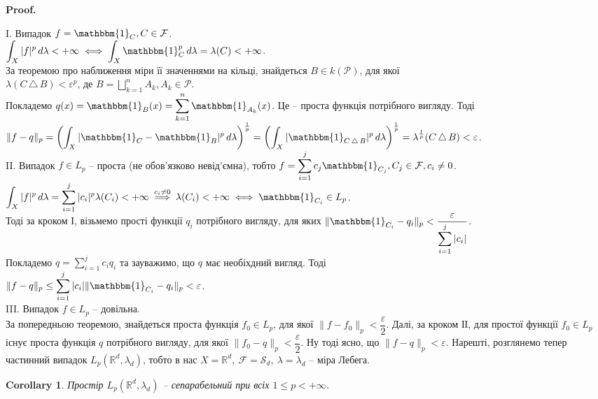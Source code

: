 \documentclass[a4paper, 10pt]{article}
\makeatletter
\theoremstyle{theoremdd}
\newtheorem{corollary}[theorem]{Corollary}
\renewenvironment{proof}[1][Proof.\\]{\par
\pushQED{\hfill \qed}%
\normalfont \topsep6\p@\@plus6\p@\relax
\trivlist
\item\relax
{\bfseries
#1\@addpunct{.}}\hspace\labelsep\ignorespaces
}{%
\popQED\endtrivlist\@endpefalse
}
\newcommand{\symdif}{\,\triangle\,} %
\makeatother
\begin{document}
\begin{proof}
I. Випадок $f = \mathbbm{1}_C, C \in \mathcal{F}$.\\
$\displaystyle\int_X |f|^p\,d\lambda < +\infty \iff \int_X \mathbbm{1}_C^p\,d\lambda = \lambda(C) < +\infty$.\\
За теоремою про наближення міри її значеннями на кільці, знайдеться $B \in k(\mathcal{P})$, для якої \\ $\lambda(C \symdif B) < \varepsilon^p$, де $B = \displaystyle\bigsqcup_{k=1}^n A_k, A_k \in \mathcal{P}$.\\
Покладемо $q(x) = \mathbbm{1}_B(x) = \displaystyle\sum_{k=1}^n \mathbbm{1}_{A_k}(x)$. Це -- проста функція потрібного вигляду. Тоді\\
$\|f-q\|_p = \displaystyle \left(\int_X |\mathbbm{1}_C - \mathbbm{1}_B|^p\,d\lambda \right)^{\frac{1}{p}} = \left( \int_X |\mathbbm{1}_{C \symdif B}|^p\,d\lambda \right)^{\frac{1}{p}} = \lambda^{\frac{1}{p}}(C \symdif B) < \varepsilon$.
\bigskip \\
II. Випадок $f \in L_p$ -- проста (не обов'язково невід'ємна), тобто $f = \displaystyle\sum_{i=1}^j c_j \mathbbm{1}_{C_j}, C_j \in \mathcal{F}, c_i \neq 0$.\\
$\displaystyle\int_X |f|^p\,d\lambda = \sum_{i=1}^j |c_i|^p \lambda(C_i) < +\infty \overset{c_i \neq 0}{\implies} \lambda(C_i) < +\infty \iff \mathbbm{1}_{C_i} \in L_p$.\\
Тоді за кроком І, візьмемо прості функції $q_i$ потрібного вигляду, для яких $\| \mathbbm{1}_{C_i} - q_i \|_p < \dfrac{\varepsilon}{\displaystyle\sum_{i=1}^j |c_i|}$.\\
Покладемо $q = \displaystyle\sum_{i=1}^j c_i q_i$ та зауважимо, що $q$ має необіхдний вигляд. Тоді\\
$\|f-q\|_p \leq \displaystyle\sum_{i=1}^j |c_i| \|\mathbbm{1}_{C_i} - q_i\|_p < \varepsilon$.
\bigskip \\
III. Випадок $f \in L_p$ -- довільна.\\
За попередньою теоремою, знайдеться проста функція $f_0 \in L_p$, для якої $\|f-f_0\|_p < \dfrac{\varepsilon}{2}$. Далі, за кроком ІІ, для простої функції $f_0 \in L_p$ існує проста функція $q$ потрібного вигляду, для якої $\|f_0-q\|_p < \dfrac{\varepsilon}{2}$. Ну тоді ясно, що $\|f-q\|_p < \varepsilon$.
\end{proof}
\noindent
Нарешті, розглянемо тепер частинний випадок $L_p(\mathbb{R}^d,\lambda_d)$, тобто в нас $X = \mathbb{R}^d,\ \mathcal{F} = \mathcal{S}_d,\ \lambda = \lambda_d$ -- міра Лебега.
\begin{corollary}
Простір $L_p(\mathbb{R}^d,\lambda_d)$ -- сепарабельний при всіх $1 \leq p < +\infty$.
\end{corollary}
\end{document}
